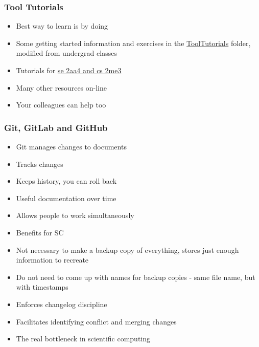 \documentclass[t,12pt,numbers,fleqn]{beamer}
\begin{document}

\begin{frame}
\frametitle{Tool Tutorials}
\begin{itemize}
\item Best way to learn is by doing
\item Some getting started information and exercises in the
  \href{https://gitlab.cas.mcmaster.ca/smiths/cas741/tree/master/ToolTutorials} {ToolTutorials}
  folder, modified from undergrad classes
\item Tutorials for
  \href{https://gitlab.cas.mcmaster.ca/smiths/se2aa4_cs2me3/tree/master/Tutorials}
  {se 2aa4 and cs 2me3}
\item Many other resources on-line
\item Your colleagues can help too
\end{itemize}
\end{frame}


\begin{frame}
\frametitle{Git, GitLab and GitHub}
\begin{itemize}
\item Git manages changes to documents
\bi
\item Tracks changes
\item Keeps history, you can roll back
\item Useful documentation over time
\item Allows people to work simultaneously
\ei
\item Benefits for SC \cite{WilsonEtAl2016}
\bi
\item Not necessary to make a backup copy of everything, stores just enough
  information to recreate
\item Do not need to come up with names for backup copies - same file name, but
  with timestamps
\item Enforces changelog discipline
\item Facilitates identifying conflict and merging changes
\ei
\item The real bottleneck in scientific computing~\cite{Wilson2006}
\end{itemize}
\end{frame}

\end{document}
